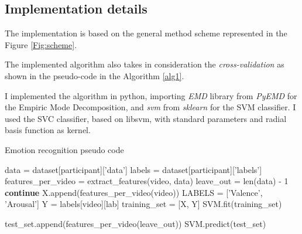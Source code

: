 \documentclass[10pt,journal,A4paper,compsoc,epsfig]{IEEEtran}
\begin{document}
\subsection{Implementation details}
The implementation is based on the general method scheme represented in the Figure \ref{Fig:scheme}.

The implemented algorithm also takes in consideration the \textit{cross-validation} as shown in the pseudo-code in the Algorithm 
\ref{alg1}.

I implemented the algorithm in python, importing \textit{EMD} library from \textit{PyEMD} for the Empiric Mode Decomposition, and \textit{svm} from \textit{sklearn} for the SVM classifier.
I used the SVC classifier, based on libsvm, with standard parameters and radial basis function as kernel.

\begin{algorithm}                      %
\caption{Emotion recognition pseudo code}          %
\label{alg1}                           %
\begin{algorithmic}                    %
		\STATE data = dataset[participant]['data']
		\STATE labels = dataset[participant]['labels']
			\STATE features\_per\_video = extract\_features(video, data)
		\ENDFOR
		\STATE leave\_out = len(data) - 1
					\STATE \textbf{continue}
				\ENDIF
				\STATE X.append(features\_per\_video(video))
			\ENDFOR
			\STATE LABELS = ['Valence', 'Arousal']
					\STATE Y = labels[video][lab]
				\ENDFOR
				\STATE training\_set = [X, Y]
				\STATE SVM.fit(training\_set)
				
				\STATE test\_set.append(features\_per\_video(leave\_out))
				\STATE SVM.predict(test\_set)
			\ENDFOR
		\ENDWHILE
	\ENDFOR
\end{algorithmic}
\end{algorithm}
\end{document}

